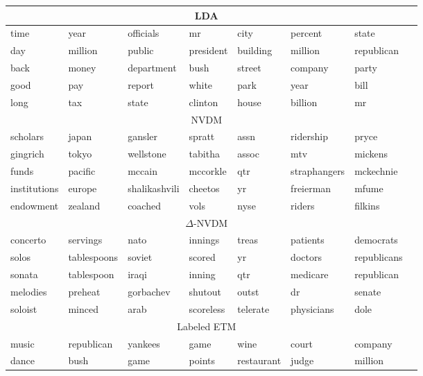 \documentclass[11pt,a4paper]{article}
\begin{document}
\begin{table*}[t]
  \centering \small {}  \vskip 0.1in
 \begin{tabular}{llllllll}
 \toprule
\multicolumn{7}{c}{LDA}\\
 \hline
     time & year & officials & mr & city & percent & state  \\
     day & million & public & president & building & million & republican  \\
     back & money & department & bush & street  & company  & party  \\
     good & pay & report  & white & park & year  & bill \\
     long & tax & state  & clinton & house & billion  & mr  \\
     \midrule 
\multicolumn{7}{c}{\gls{NVDM}}\\
\hline
     scholars & japan & gansler & spratt & assn & ridership & pryce \\
     gingrich & tokyo & wellstone & tabitha & assoc & mtv & mickens  \\
     funds & pacific & mccain & mccorkle & qtr & straphangers & mckechnie   \\
     institutions & europe & shalikashvili & cheetos & yr & freierman & mfume \\
     endowment & zealand & coached & vols  & nyse  & riders & filkins \\
\midrule
\multicolumn{7}{c}{$\Delta$-\gls{NVDM}}\\
\hline
     concerto & servings & nato & innings & treas & patients & democrats  \\
     solos & tablespoons & soviet & scored & yr & doctors  & republicans \\
     sonata & tablespoon & iraqi & inning & qtr & medicare & republican \\
     melodies & preheat  &  gorbachev & shutout & outst  & dr & senate \\
     soloist & minced &  arab & scoreless & telerate & physicians & dole \\
\midrule
\multicolumn{7}{c}{Labeled \gls{ETM}}\\
\hline
     music & republican & yankees & game &  wine &  court & company  \\
     dance & bush & game & points & restaurant &  judge & million \\

\end{tabular}
\end{table*}
\end{document}
